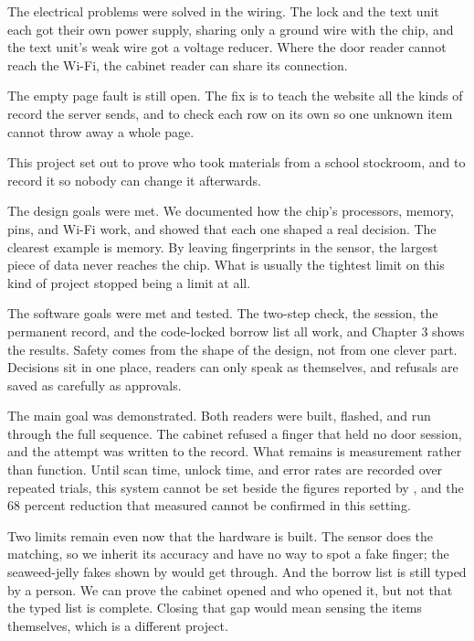 The electrical problems were solved in the wiring. The lock and the text unit
each got their own power supply, sharing only a ground wire with the chip, and
the text unit's weak wire got a voltage reducer. Where the door reader cannot
reach the Wi-Fi, the cabinet reader can share its connection.

The empty page fault is still open. The fix is to teach the website all the
kinds of record the server sends, and to check each row on its own so one
unknown item cannot throw away a whole page.


This project set out to prove who took materials from a school stockroom, and to
record it so nobody can change it afterwards.

The design goals were met. We documented how the chip's processors, memory,
pins, and Wi-Fi work, and showed that each one shaped a real decision. The
clearest example is memory. By leaving fingerprints in the sensor, the largest
piece of data never reaches the chip. What is usually the tightest limit on this
kind of project stopped being a limit at all.

The software goals were met and tested. The two-step check, the session, the
permanent record, and the code-locked borrow list all work, and Chapter 3 shows
the results. Safety comes from the shape of the design, not from one clever
part. Decisions sit in one place, readers can only speak as themselves, and
refusals are saved as carefully as approvals.

The main goal was demonstrated. Both readers were built, flashed, and run
through the full sequence. The cabinet refused a finger that held no door
session, and the attempt was written to the record. What remains is measurement
rather than function. Until scan time, unlock time, and error rates are recorded
over repeated trials, this system cannot be set beside the figures reported by
\textcite{alsayaydeh2025}, and the 68 percent reduction that
\textcite{mohammed2025} measured cannot be confirmed in this setting.

Two limits remain even now that the hardware is built. The sensor does the
matching, so we inherit its accuracy and have no way to spot a fake finger; the
seaweed-jelly fakes shown by \textcite{rad2024} would get through. And the
borrow list is still typed by a person. We can prove the cabinet opened and who
opened it, but not that the typed list is complete. Closing that gap would mean
sensing the items themselves, which is a different project.

